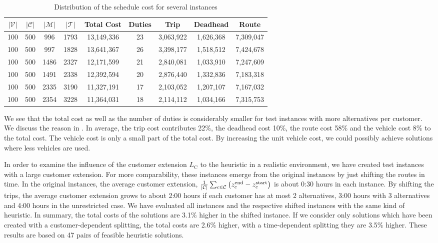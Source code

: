 \begin{table}[htb]
	\centering
	\begin{tabular}{ccccccccc}
		\toprule
		$\vert\mathcal{V}\vert$ & $\vert\mathcal{C}\vert$ & $\vert\mathcal{M}\vert$ & $\vert\mathcal{T}\vert$ & Total Cost & Duties & Trip & Deadhead & Route \\
		\midrule
		100 & 500 &  996 & 1793 & 13,149,336 & 23 & 3,063,922 & 1,626,368 & 7,309,047 \\
		100 & 500 &  997 & 1828 & 13,641,367 & 26 & 3,398,177 & 1,518,512 & 7,424,678 \\
		100 & 500 & 1486 & 2327 & 12,171,599 & 21 & 2,840,081 & 1,033,910 & 7,247,609 \\
		100 & 500 & 1491 & 2338 & 12,392,594 & 20 & 2,876,440 & 1,332,836 & 7,183,318 \\
		100 & 500 & 2335 & 3190 & 11,327,191 & 17 & 2,103,052 & 1,207,107 & 7,167,032 \\
		100 & 500 & 2354 & 3228 & 11,364,031 & 18 & 2,114,112 & 1,034,166 & 7,315,753 \\
		\bottomrule
	\end{tabular}
	\caption{Distribution of the schedule cost for several instances	}
	\label{tab:results:general}
\end{table}

We see that the total cost as well as the number of duties is considerably smaller for test instances with more alternatives per customer. We discuss the reason in . In average, the trip cost contributes 22\%, the deadhead cost 10\%, the route cost 58\% and the vehicle cost 8\% to the total cost. The vehicle cost is only a small part of the total cost. By increasing the unit vehicle cost, we could possibly achieve solutions where less vehicles are used.

In order to examine the influence of the customer extension $L_{\operatorname{C}}$ to the heuristic in a realistic environment, we have created test instances with a large customer extension. For more comparability, these instances emerge from the original instances by just shifting the routes in time. In the original instances, the average customer extension, \ie ${\frac{1}{\vert\mathcal{C}\vert}\sum_{c\in\mathcal{C}}\left(z^{\operatorname{end}}_c - z^{\operatorname{start}}_c\right)}$ is about 0:30 hours in each instance. By shifting the trips, the average customer extension grows to about 2:00 hours if each customer has at most 2 alternatives, 3:00 hours with 3 alternatives and 4:00 hours in the unrestricted case. We have evaluated all instances and the respective shifted instances with the same kind of heuristic. In summary, the total costs of the solutions are 3.1\% higher in the shifted instance. If we consider only solutions which have been created with a customer-dependent splitting, the total costs are 2.6\% higher, with a time-dependent splitting they are 3.5\% higher. These results are based on 47 pairs of feasible heuristic solutions.

